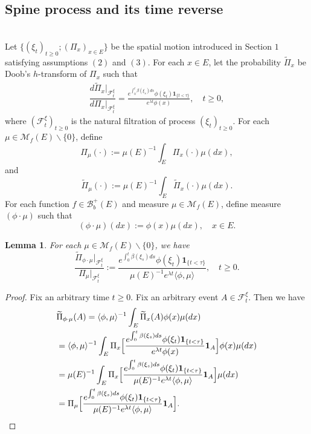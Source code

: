 \documentclass[12pt,a4paper]{amsart}
\numberwithin{equation}{section}
\theoremstyle{plain}
\newtheorem{lem}[thm]{Lemma}
\theoremstyle{definition}
\theoremstyle{remark}
\begin{document}
\subsection{Spine process and its time reverse}
\hspace*{10pt}\\
	Let $\{(\xi_t)_{t\geq 0}; (\Pi_x)_{x\in E}\}$ be the spatial motion introduced in Section $1$ satisfying assumptions $(2)$ and $(3)$.
For each $x\in E$, let the probability $\widetilde \Pi_{x}$ be Doob's $h$-transform of $\Pi_x$ such that
\begin{align}
	\dfrac{d\widetilde{\Pi}_x|_{\mathscr F^{\xi}_t}}{d\Pi_x|_{\mathscr F^{\xi}_t}}= \frac{e^{\int_0^t \beta(\xi_s)ds}\phi(\xi_t) \mathbf 1_{\{t<\tau\}}}{e^{\lambda t}\phi(x)},
	\quad t\geq 0,
\end{align}
	where $(\mathscr F_t^{\xi})_{t\geq 0}$ is the natural filtration of process $(\xi_t)_{t\geq 0}$. 	For each $\mu \in \mathcal M_f(E)\backslash\{0\}$, define
\[
	\Pi_{\mu}(\cdot)
	:= \mu(E)^{-1}\int_{E} \Pi_x(\cdot)\mu(dx),
\]
    and
\[
	\widetilde\Pi_{\mu}(\cdot):= \mu(E)^{-1} \int_E\widetilde\Pi_x(\cdot)\mu(dx).
\]
	For each function $f \in \mathcal B_b^+(E)$ and measure $\mu \in \mathcal M_f(E)$, define measure $(\phi \cdot\mu)$ such that
\[
    (\phi \cdot \mu)(dx)
    := \phi(x)\mu(dx),
    \quad x\in E.
\]
\begin{lem}
	For each $\mu\in \mathcal M_f(E)\backslash\{0\}$, we have
\[
	\dfrac{\widetilde \Pi_{\phi\cdot\mu}|_{\mathscr F_t^{\xi}}}{\Pi_{\mu}|_{\mathscr F_t^{\xi}}}
  	:= \frac{e^{\int_0^t \beta(\xi_s)ds}\phi(\xi_t) \mathbf 1_{\{t<\tau\}}}{\mu(E)^{-1}e^{\lambda t}\langle \phi,\mu\rangle},
  	\quad t\geq 0.
\]
\end{lem}
\begin{proof}
	Fix an arbitrary time $t\geq 0$. Fix an arbitrary event $A \in \mathscr F_t^{\xi}$.
	Then we have
\begin{align}
	&\widetilde{\Pi}_{\phi\cdot\mu}(A)
	= \langle\phi, \mu\rangle^{-1} \int_E \widetilde \Pi_x(A)\phi(x)\mu(dx)
	\\&=\langle\phi, \mu\rangle^{-1} \int_E  \Pi_x\Big[\frac{e^{\int_0^t \beta(\xi_s)ds}\phi(\xi_t) \mathbf 1_{\{t<\tau\}}}{e^{\lambda t}\phi(x)} \mathbf 1_A\Big]\phi(x)\mu(dx)
	\\&= \mu(E)^{-1}\int_E  \Pi_x\Big[\frac{e^{\int_0^t \beta(\xi_s)ds}\phi(\xi_t) \mathbf 1_{\{t<\tau\}}}{\mu(E)^{-1}e^{\lambda t}\langle \phi,\mu\rangle} \mathbf 1_A\Big]\mu(dx)
	\\&= \Pi_{\mu}\Big[\frac{e^{\int_0^t \beta(\xi_s)ds}\phi(\xi_t) \mathbf 1_{\{t<\tau\}}}{\mu(E)^{-1} e^{\lambda t}\langle \phi,\mu\rangle} \mathbf 1_A\Big].
	\qedhere
\end{align}
\end{proof}
\end{document}
